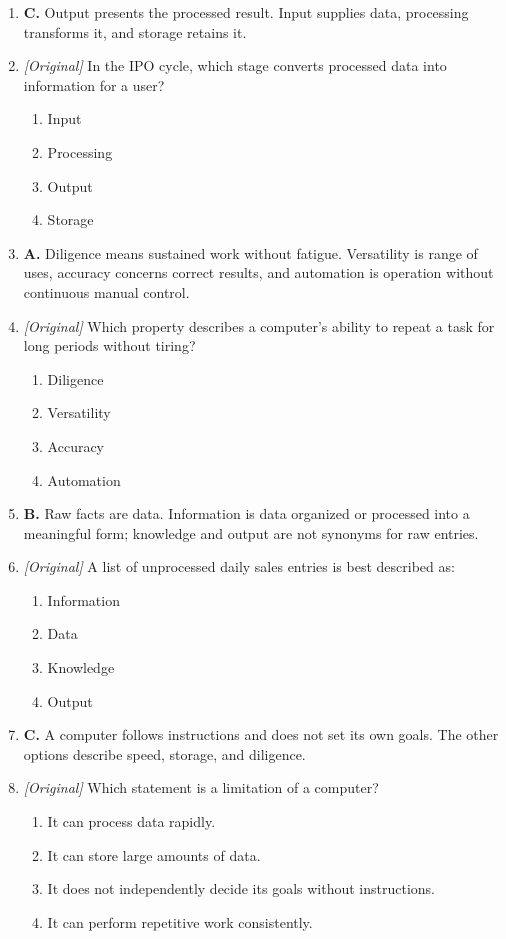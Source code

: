 \newcommand{\JKSSBItem}[5]{%
  \ifnum\JKSSBAnswers=1
    \item \textbf{#4.} #5
  \else
    \item \textit{#1} #2
      \begin{enumerate}[label=\Alph*.]
        #3
      \end{enumerate}
  \fi
}

\begin{enumerate}[label=\textbf{Q\arabic*.}, leftmargin=*]
\ifnum{}
  \setcounter{enumi}{26}
\else\ifnum{}
  \setcounter{enumi}{27}
\else
  \setcounter{enumi}{25}
\fi\fi
\ifnum{}
\JKSSBItem{[Original]}{In the IPO cycle, which stage converts processed data into information for a user?}
  {\item Input
   \item Processing
   \item Output
   \item Storage}
  {C}{Output presents the processed result. Input supplies data, processing transforms it, and storage retains it.}
\JKSSBItem{[Original]}{Which property describes a computer's ability to repeat a task for long periods without tiring?}
  {\item Diligence
   \item Versatility
   \item Accuracy
   \item Automation}
  {A}{Diligence means sustained work without fatigue. Versatility is range of uses, accuracy concerns correct results, and automation is operation without continuous manual control.}
\JKSSBItem{[Original]}{A list of unprocessed daily sales entries is best described as:}
  {\item Information
   \item Data
   \item Knowledge
   \item Output}
  {B}{Raw facts are data. Information is data organized or processed into a meaningful form; knowledge and output are not synonyms for raw entries.}
\JKSSBItem{[Original]}{Which statement is a limitation of a computer?}
  {\item It can process data rapidly.
   \item It can store large amounts of data.
   \item It does not independently decide its goals without instructions.
   \item It can perform repetitive work consistently.}
  {C}{A computer follows instructions and does not set its own goals. The other options describe speed, storage, and diligence.}

\end{enumerate}
